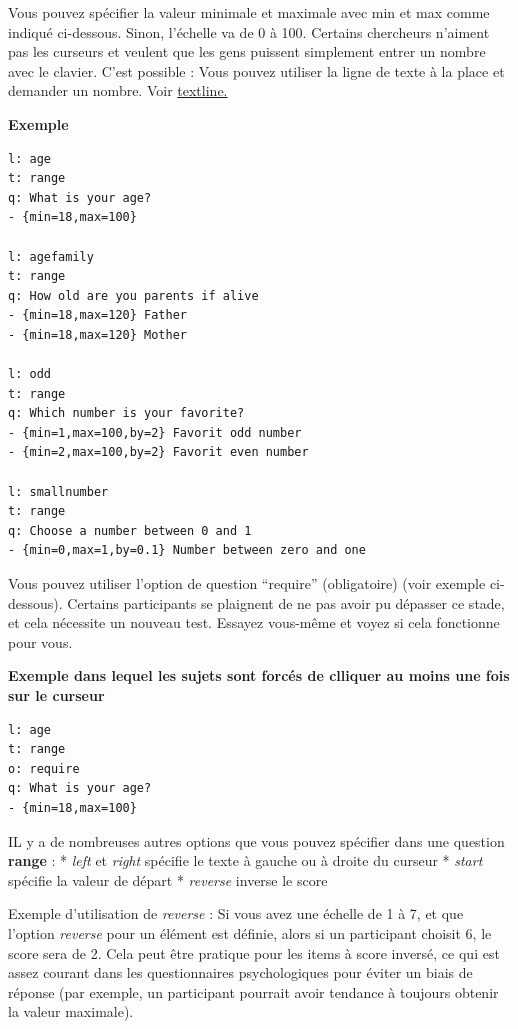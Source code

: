 \documentclass[
]{book}
\begin{document}
Vous pouvez spécifier la valeur minimale et maximale avec min et max
comme indiqué ci-dessous. Sinon, l'échelle va de 0 à 100. Certains
chercheurs n'aiment pas les curseurs et veulent que les gens puissent
simplement entrer un nombre avec le clavier. C'est possible : Vous
pouvez utiliser la ligne de texte à la place et demander un nombre. Voir
\protect\hyperlink{textline}{textline.}

\textbf{Exemple}

\begin{verbatim}
l: age
t: range
q: What is your age?
- {min=18,max=100}

l: agefamily
t: range
q: How old are you parents if alive
- {min=18,max=120} Father
- {min=18,max=120} Mother

l: odd
t: range
q: Which number is your favorite?
- {min=1,max=100,by=2} Favorit odd number
- {min=2,max=100,by=2} Favorit even number

l: smallnumber
t: range
q: Choose a number between 0 and 1
- {min=0,max=1,by=0.1} Number between zero and one
\end{verbatim}

Vous pouvez utiliser l'option de question ``require'' (obligatoire)
(voir exemple ci-dessous). Certains participants se plaignent de ne pas
avoir pu dépasser ce stade, et cela nécessite un nouveau test. Essayez
vous-même et voyez si cela fonctionne pour vous.

\textbf{Exemple dans lequel les sujets sont forcés de clliquer au moins
une fois sur le curseur}

\begin{verbatim}
l: age
t: range
o: require
q: What is your age?
- {min=18,max=100}
\end{verbatim}

IL y a de nombreuses autres options que vous pouvez spécifier dans une
question \textbf{range} : * \emph{left} et \emph{right} spécifie le
texte à gauche ou à droite du curseur * \emph{start} spécifie la valeur
de départ * \emph{reverse} inverse le score

Exemple d'utilisation de \emph{reverse} : Si vous avez une échelle de 1
à 7, et que l'option \emph{reverse} pour un élément est définie, alors
si un participant choisit 6, le score sera de 2. Cela peut être pratique
pour les items à score inversé, ce qui est assez courant dans les
questionnaires psychologiques pour éviter un biais de réponse (par
exemple, un participant pourrait avoir tendance à toujours obtenir la
valeur maximale).
\end{document}
